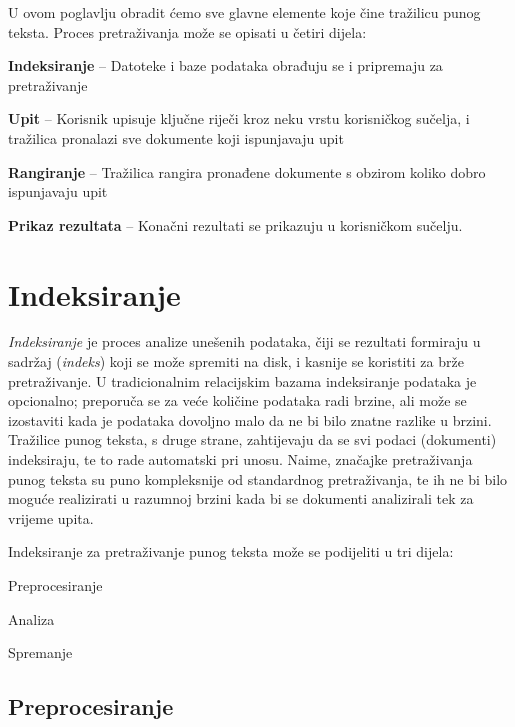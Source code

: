 \documentclass[a4paper,twoside,12pt]{scrreprt}
\begin{document}
U ovom poglavlju obradit ćemo sve glavne elemente koje čine tražilicu punog teksta. Proces pretraživanja može se opisati u četiri dijela:

\begin{compactenum}
  \item \textbf{Indeksiranje} – Datoteke i baze podataka obrađuju se i pripremaju za pretraživanje
  \item \textbf{Upit} – Korisnik upisuje ključne riječi kroz neku vrstu korisničkog sučelja, i tražilica pronalazi sve dokumente koji ispunjavaju upit
  \item \textbf{Rangiranje} – Tražilica rangira pronađene dokumente s obzirom koliko dobro ispunjavaju upit
  \item \textbf{Prikaz rezultata} – Konačni rezultati se prikazuju u korisničkom sučelju.
\end{compactenum}

\section{Indeksiranje}
\label{indexing}

\textit{Indeksiranje} je proces analize unešenih podataka, čiji se rezultati formiraju u sadržaj (\textit{indeks}) koji se može spremiti na disk, i kasnije se koristiti za brže pretraživanje. U tradicionalnim relacijskim bazama indeksiranje podataka je opcionalno; preporuča se za veće količine podataka radi brzine, ali može se izostaviti kada je podataka dovoljno malo da ne bi bilo znatne razlike u brzini. Tražilice punog teksta, s druge strane, zahtijevaju da se svi podaci (dokumenti) indeksiraju, te to rade automatski pri unosu. Naime, značajke pretraživanja punog teksta su puno kompleksnije od standardnog pretraživanja, te ih ne bi bilo moguće realizirati u razumnoj brzini kada bi se dokumenti analizirali tek za vrijeme upita.

Indeksiranje za pretraživanje punog teksta može se podijeliti u tri dijela:

\begin{compactenum}
  \item Preprocesiranje
  \item Analiza
  \item Spremanje
\end{compactenum}

\subsection{Preprocesiranje}
\end{document}
